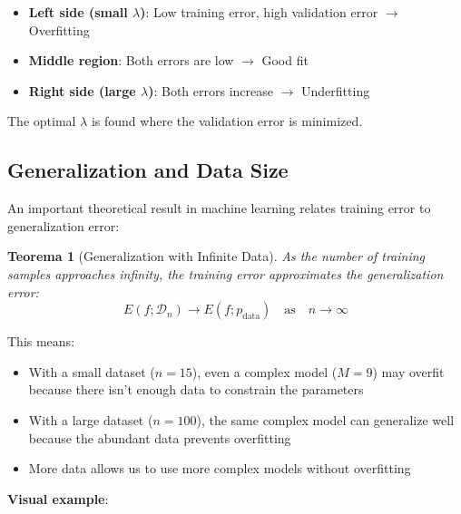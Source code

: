 \documentclass[11pt,a4paper]{article}
\theoremstyle{definition}
\theoremstyle{plain}
\newtheorem{theorem}{Teorema}[section]
\theoremstyle{remark}
\begin{document}
\begin{itemize}
    \item \textbf{Left side (small $\lambda$)}: Low training error, high validation error $\rightarrow$ Overfitting
    \item \textbf{Middle region}: Both errors are low $\rightarrow$ Good fit
    \item \textbf{Right side (large $\lambda$)}: Both errors increase $\rightarrow$ Underfitting
\end{itemize}

The optimal $\lambda$ is found where the validation error is minimized.

\subsection{Generalization and Data Size}

An important theoretical result in machine learning relates training error to generalization error:

\begin{theorem}[Generalization with Infinite Data]
As the number of training samples approaches infinity, the training error approximates the generalization error:
\[
E(f; \mathcal{D}_n) \to E(f; p_{\text{data}}) \quad \text{as} \quad n \to \infty
\]
\end{theorem}

This means:
\begin{itemize}
    \item With a small dataset ($n = 15$), even a complex model ($M = 9$) may overfit because there isn't enough data to constrain the parameters
    \item With a large dataset ($n = 100$), the same complex model can generalize well because the abundant data prevents overfitting
    \item More data allows us to use more complex models without overfitting
\end{itemize}

\textbf{Visual example}:
\end{document}
